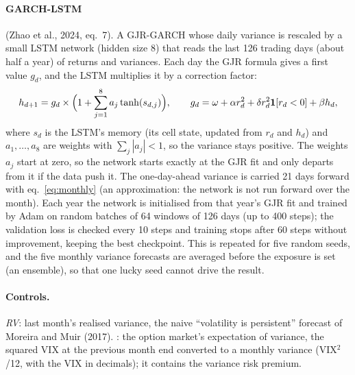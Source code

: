 \documentclass[12pt]{article}
\begin{document}
\paragraph{GARCH-LSTM} (Zhao et al., 2024, eq.~7). A GJR-GARCH whose daily variance is rescaled by a small LSTM network (hidden size 8) that reads the last 126 trading days (about half a year) of returns and variances. Each day the GJR formula gives a first value $g_d$, and the LSTM multiplies it by a correction factor:
\begin{equation}
h_{d+1}=g_d\times\Bigl(1+\sum_{j=1}^{8} a_j\tanh(s_{d,j})\Bigr),\qquad g_d=\omega+\alpha r_d^2+\delta r_d^2\mathbf 1[r_d<0]+\beta h_d,
\end{equation}
where $s_d$ is the LSTM's memory (its cell state, updated from $r_d$ and $h_d$) and $a_1,\dots,a_8$ are weights with $\sum_j|a_j|<1$, so the variance stays positive. The weights $a_j$ start at zero, so the network starts exactly at the GJR fit and only departs from it if the data push it. The one-day-ahead variance is carried 21 days forward with eq.~\eqref{eq:monthly} (an approximation: the network is not run forward over the month). Each year the network is initialised from that year's GJR fit and trained by Adam on random batches of 64 windows of 126 days (up to 400 steps); the validation loss is checked every 10 steps and training stops after 60 steps without improvement, keeping the best checkpoint. This is repeated for five random seeds, and the five monthly variance forecasts are averaged before the exposure is set (an ensemble), so that one lucky seed cannot drive the result.

\paragraph{Controls.} \textit{RV}: last month's realised variance, the naive ``volatility is persistent'' forecast of Moreira and Muir (2017). \textit{\VIX}: the option market's expectation of variance, the squared VIX at the previous month end converted to a monthly variance (VIX$^2$/12, with the VIX in decimals); it contains the variance risk premium.
\end{document}
